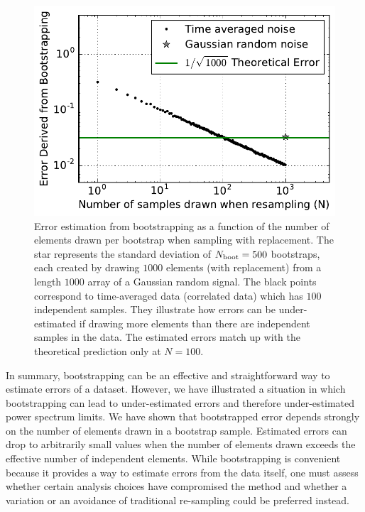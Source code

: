 \documentclass[preprint2,numberedappendix,tighten]{aastex6}
\begin{document}
\begin{figure}
	\centering
	\includegraphics[trim={0cm 0cm 0cm 0cm},width=\columnwidth]{plots/toy_error1.pdf}
	\caption{Error estimation from bootstrapping as a function of the number of elements drawn per bootstrap when 
sampling with replacement. The star represents the standard deviation of $N_{\rm boot}=500$ bootstraps, each created by drawing $1000$ 
elements (with replacement) from a length $1000$ array of a Gaussian random signal. The black points correspond to time-averaged data (correlated data) which has $100$ independent samples. They illustrate how errors can be under-estimated if 
drawing more elements than there are independent samples in the data. The estimated errors match up with the theoretical 
prediction only at $N=100$.}
	\label{fig:toy_error1}
\end{figure}

In summary, bootstrapping can be an effective and straightforward way to estimate errors of a dataset. However, we have 
illustrated a situation in which bootstrapping can lead to under-estimated errors and therefore under-estimated power spectrum limits. We have shown that 
bootstrapped error depends strongly on the number of elements drawn in a bootstrap sample. Estimated errors can drop to 
arbitrarily small values when the number of elements drawn exceeds the effective number of independent elements. 
While bootstrapping is convenient because it provides a way to estimate errors from the data itself, one must assess whether certain 
analysis choices have compromised the method and whether a variation or an avoidance of traditional re-sampling could be preferred instead.
\end{document}

